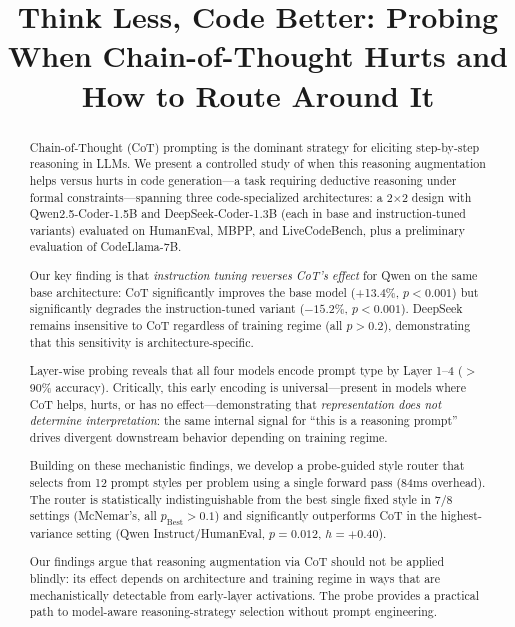 \documentclass[11pt]{article}
\title{Think Less, Code Better: Probing When Chain-of-Thought Hurts and How to Route Around It}
\begin{document}
\maketitle

\begin{abstract}
Chain-of-Thought (CoT) prompting is the dominant strategy for eliciting step-by-step reasoning in LLMs. We present a controlled study of when this reasoning augmentation helps versus hurts in code generation---a task requiring deductive reasoning under formal constraints---spanning three code-specialized architectures: a 2$\times$2 design with Qwen2.5-Coder-1.5B and DeepSeek-Coder-1.3B (each in base and instruction-tuned variants) evaluated on HumanEval, MBPP, and LiveCodeBench, plus a preliminary evaluation of CodeLlama-7B.

Our key finding is that \emph{instruction tuning reverses CoT's effect} for Qwen on the same base architecture: CoT significantly improves the base model (+13.4\%, $p{<}0.001$) but significantly degrades the instruction-tuned variant ($-15.2\%$, $p{<}0.001$). DeepSeek remains insensitive to CoT regardless of training regime (all $p{>}0.2$), demonstrating that this sensitivity is architecture-specific.

Layer-wise probing reveals that all four models encode prompt type by Layer 1--4 ($>$90\% accuracy). Critically, this early encoding is universal---present in models where CoT helps, hurts, or has no effect---demonstrating that \emph{representation does not determine interpretation}: the same internal signal for ``this is a reasoning prompt'' drives divergent downstream behavior depending on training regime.

Building on these mechanistic findings, we develop a probe-guided style router that selects from 12 prompt styles per problem using a single forward pass (84ms overhead). The router is statistically indistinguishable from the best single fixed style in 7/8 settings (McNemar's, all $p_{\text{Best}}{>}0.1$) and significantly outperforms CoT in the highest-variance setting (Qwen Instruct/HumanEval, $p{=}0.012$, $h{=}+0.40$).

Our findings argue that reasoning augmentation via CoT should not be applied blindly: its effect depends on architecture and training regime in ways that are mechanistically detectable from early-layer activations. The probe provides a practical path to model-aware reasoning-strategy selection without prompt engineering.
\end{abstract}
\end{document}
